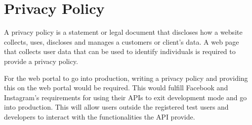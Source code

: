 \section{Privacy Policy}
A privacy policy is a statement or legal document that discloses how a website collects, uses, discloses and manages a customers or client's data. A web page that collects user data that can be used to identify individuals is required to provide a privacy policy.

For the web portal to go into production, writing a privacy policy and providing this on the web portal would be required. This would fulfill Facebook and Instagram's requirements for using their APIs to exit development mode and go into production. This will allow users outside the registered test users and developers to interact with the functionalities the API provide.

\cleardoublepage